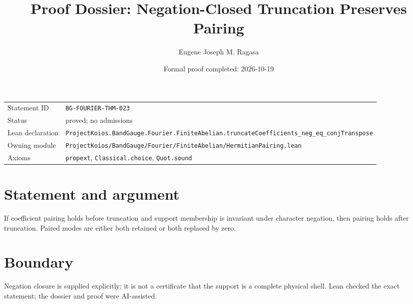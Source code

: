 \documentclass[11pt]{article}
\title{Proof Dossier: Negation-Closed Truncation Preserves Pairing}
\author{Eugene Joseph M. Ragasa}
\date{Formal proof completed: 2026-10-19}
\begin{document}
\maketitle
\noindent\begin{tabularx}{\textwidth}{@{}lX@{}}\toprule
Statement ID & \texttt{BG-FOURIER-THM-023} \\
Status & proved; no admissions \\
Lean declaration & \texttt{ProjectKoios.BandGauge.Fourier.FiniteAbelian.}\newline\texttt{truncateCoefficients\_neg\_eq\_conjTranspose} \\
Owning module & \texttt{ProjectKoios/BandGauge/Fourier/FiniteAbelian/HermitianPairing.lean} \\
Axioms & \texttt{propext}, \texttt{Classical.choice}, \texttt{Quot.sound} \\
\bottomrule\end{tabularx}
\section{Statement and argument}
If coefficient pairing holds before truncation and support membership is invariant under character negation, then pairing holds after truncation. Paired modes are either both retained or both replaced by zero.
\section{Boundary}
Negation closure is supplied explicitly; it is not a certificate that the support is a complete physical shell. Lean checked the exact statement; the dossier and proof were AI-assisted.
\end{document}
